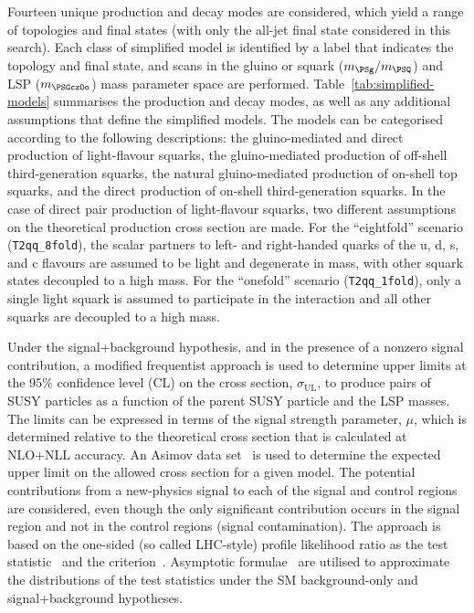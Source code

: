 Fourteen unique production and decay modes are considered, which yield
a range of topologies and final states (with only the all-jet final
state considered in this search). Each class of simplified model is
identified by a label that indicates the topology and final state, and
scans in the gluino or squark ($m_{\PSg} / m_{\PSQ}$) and LSP
($m_{\PSGczDo}$) mass parameter space are performed.
Table~\ref{tab:simplified-models} summarises the production and decay
modes, as well as any additional assumptions that define the
simplified models. The models can be categorised according to the
following descriptions: the gluino-mediated and direct production of
light-flavour squarks, the gluino-mediated production of off-shell
third-generation squarks, the natural gluino-mediated production
of on-shell top squarks, and the direct production of on-shell
third-generation squarks. In the case of direct pair production of
light-flavour squarks, two different assumptions on the theoretical
production cross section are made. For the ``eightfold'' scenario
(\texttt{T2qq\_8fold}), the scalar partners to left- and right-handed
quarks of the u, d, s, and c flavours are assumed to be light and
degenerate in mass, with other squark states decoupled to a high
mass. For the ``onefold'' scenario (\texttt{T2qq\_1fold}), only a
single light squark is assumed to participate in the interaction and
all other squarks are decoupled to a high mass.

Under the signal+background hypothesis, and in the presence of a
nonzero signal contribution, a modified frequentist approach is used
to determine upper limits at the 95\% confidence level (CL) on the
cross section, $\sigma_\mathrm{UL}$, to produce pairs of SUSY
particles as a function of the parent SUSY particle and the LSP
masses. The limits can be expressed in terms of the signal strength
parameter, $\mu$, which is determined relative to the theoretical
cross section that is calculated at NLO+NLL accuracy. 
An Asimov data set~\cite{Cowan:2010js} is used to determine the
expected upper limit on the allowed cross section for a given model.
The potential contributions from a new-physics signal to each of the
signal and control regions are considered, even though the only
significant contribution occurs in the signal region and not in the
control regions (\ie signal contamination). The approach is based on
the one-sided (so called LHC-style) profile likelihood ratio as the
test statistic~\cite{CMS-NOTE-2011-005} and the \cls
criterion~\cite{junk, read}. Asymptotic formulae~\cite{Cowan:2010js}
are utilised to approximate the distributions of the test statistics
under the SM background-only and signal+background hypotheses. 

